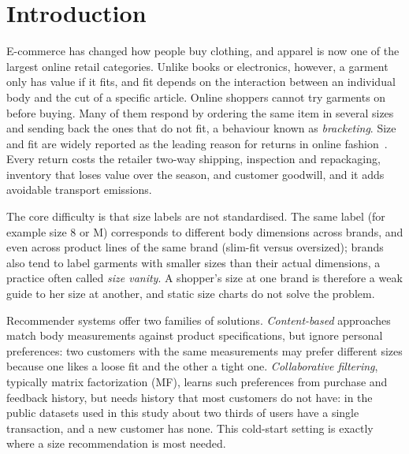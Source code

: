 \documentclass[pdflatex,sn-mathphys-num]{sn-jnl}
\begin{document}
\maketitle

\section{Introduction}\label{sec1}

E-commerce has changed how people buy clothing, and apparel is now one of the largest online retail categories. Unlike books or electronics, however, a garment only has value if it fits, and fit depends on the interaction between an individual body and the cut of a specific article. Online shoppers cannot try garments on before buying. Many of them respond by ordering the same item in several sizes and sending back the ones that do not fit, a behaviour known as \emph{bracketing}. Size and fit are widely reported as the leading reason for returns in online fashion~\cite{sheikh2019sfnet,nestler2021sizeflags}. Every return costs the retailer two-way shipping, inspection and repackaging, inventory that loses value over the season, and customer goodwill, and it adds avoidable transport emissions.

The core difficulty is that size labels are not standardised. The same label (for example size 8 or M) corresponds to different body dimensions across brands, and even across product lines of the same brand (slim-fit versus oversized); brands also tend to label garments with smaller sizes than their actual dimensions, a practice often called \emph{size vanity}. A shopper's size at one brand is therefore a weak guide to her size at another, and static size charts do not solve the problem.

Recommender systems offer two families of solutions. \emph{Content-based} approaches match body measurements against product specifications, but ignore personal preferences: two customers with the same measurements may prefer different sizes because one likes a loose fit and the other a tight one. \emph{Collaborative filtering}, typically matrix factorization (MF), learns such preferences from purchase and feedback history, but needs history that most customers do not have: in the public datasets used in this study about two thirds of users have a single transaction, and a new customer has none. This cold-start setting is exactly where a size recommendation is most needed.
\end{document}
